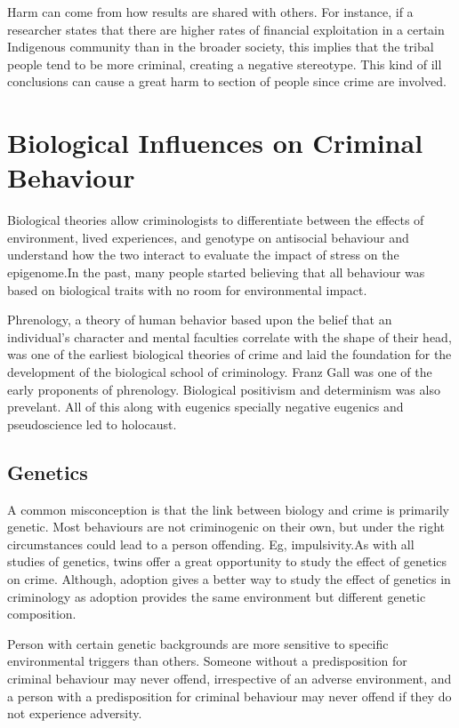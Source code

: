 \documentclass[11pt]{article}
\begin{document}
Harm can come from how results are shared with others. For instance, if a researcher states that there are higher rates of financial exploitation in a certain Indigenous community than in the broader society, this implies that the tribal people tend to be more criminal, creating a negative stereotype. This kind of ill conclusions can cause a great harm to section of people since crime are involved.

\section{Biological Influences on Criminal Behaviour}

Biological theories allow criminologists to differentiate between the effects of environment, lived experiences, and genotype on antisocial behaviour and understand how the two interact to evaluate the impact of stress on the epigenome.In the past, many people started believing that all behaviour was based on biological traits with no room for environmental impact.

Phrenology, a theory of human behavior based upon the belief that an individual’s character and mental faculties correlate with the shape of their head, was one of the earliest biological theories of crime and laid the foundation for the development of the biological school of criminology. Franz Gall was one of the early proponents of phrenology. Biological positivism and determinism was also prevelant. All of this along with eugenics specially negative eugenics and pseudoscience led to holocaust.

\subsection{Genetics}

A common misconception is that  the link between biology and crime is primarily genetic. Most behaviours are not criminogenic on their own, but under the right circumstances could lead to a person offending. Eg, impulsivity.As with all studies of genetics, twins offer a great opportunity to study the effect of genetics on crime. Although, adoption gives a better way to study the effect of genetics in criminology as adoption provides the same environment but different genetic composition.

Person with certain genetic backgrounds are more sensitive to specific environmental triggers than others. Someone without a predisposition for criminal behaviour may never offend, irrespective of an adverse environment, and a person with a predisposition for criminal behaviour may never offend if they do not experience adversity.
\end{document}
